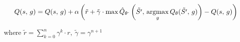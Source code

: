 \documentclass{article}
\DeclareMathOperator*{\argmax}{argmax}
\begin{document}
\begin{equation*}
Q(s,\,g)=Q(s,\,g)+\alpha\left(\tilde{r}+\tilde{\gamma}\cdot\max \hat{Q}_{\theta^{\textnormal{-}}}\left(\tilde{S'},\,\argmax\limits_g Q_{\theta}(\tilde{S'},\,g)\right)-Q(s,\,g)\right)
\end{equation*}

where $\tilde{r}=\sum_{k=0}^n\gamma^k\cdot r,~\tilde{\gamma}=\gamma^{n+1}$
\end{document}
